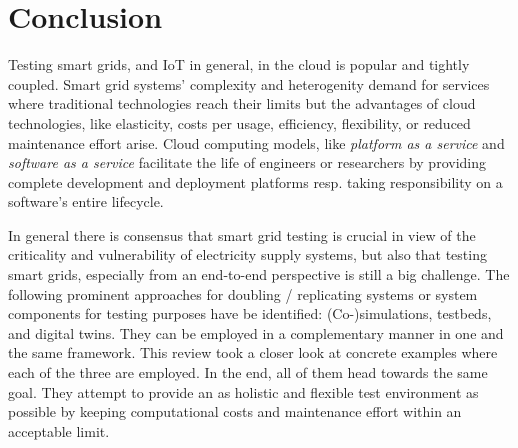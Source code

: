 \section{Conclusion}

Testing smart grids, and IoT in general, in the cloud is popular and tightly coupled. Smart grid systems' complexity and heterogenity demand for services where traditional technologies reach their limits but the advantages of cloud technologies, like elasticity, costs per usage, efficiency, flexibility, or reduced maintenance effort arise. Cloud computing models, like \textit{platform as a service} and \textit{software as a service} facilitate the life of engineers or researchers by providing complete development and deployment platforms resp. taking responsibility on a software's entire lifecycle.

In general there is consensus that smart grid testing is crucial in view of the criticality and vulnerability of electricity supply systems, but also that testing smart grids, especially from an end-to-end perspective is still a big challenge. The following prominent approaches for doubling / replicating systems or system components for testing purposes have be identified: (Co-)simulations, testbeds, and digital twins. They can be employed in a complementary manner in one and the same framework. This review took a closer look at concrete examples where each of the three are employed. In the end, all of them head towards the same goal. They attempt to provide an as holistic and flexible test environment as possible by keeping computational costs and maintenance effort within an acceptable limit.
